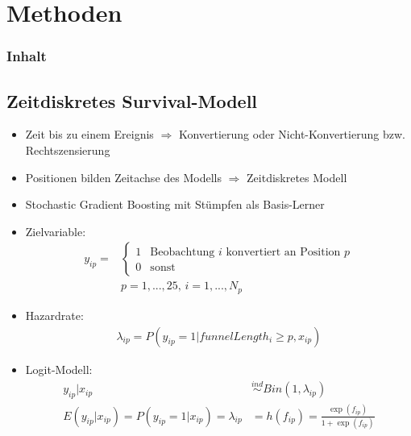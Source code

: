 \section{Methoden}

\begin{frame}\frametitle{Inhalt}
\end{frame}

\subsection{Zeitdiskretes Survival-Modell}

\begin{frame}
	\begin{itemize}
		\item Zeit bis zu einem Ereignis $\Rightarrow$ Konvertierung oder Nicht-Konvertierung bzw. Rechtszensierung
		\item Positionen bilden Zeitachse des Modells $\Rightarrow$ Zeitdiskretes Modell
		\item Stochastic Gradient Boosting mit Stümpfen als Basis-Lerner
	\end{itemize}
\end{frame}

\begin{frame}
	\begin{itemize}
		\item Zielvariable:	
			\begin{align*}
				y_{ip} =& \begin{cases} 1 & \text{Beobachtung } i \text{ konvertiert an Position } p\\
															 0 & \text{sonst} 
								 \end{cases}\\
								&p=1,...,25 \text{, } i=1,...,N_p 
			\end{align*}	
		\item Hazardrate: 
			\begin{align*}
				\lambda_{ip} = P(y_{ip}=1|funnelLength_i \geq p, x_{ip})
			\end{align*}
		\item Logit-Modell: 
			\begin{align*}
				y_{ip}|x_{ip} &\stackrel{ind}{\sim} Bin(1, \lambda_{ip})  \\
				E(y_{ip}|x_{ip}) = P(y_{ip} = 1|x_{ip}) = \lambda_{ip} &= h(f_{ip}) = \frac{\exp(f_{ip})}{1+\exp(f_{ip})}
			\end{align*}
	\end{itemize}
\end{frame}


